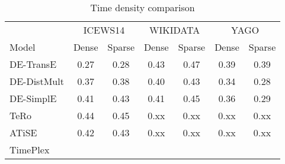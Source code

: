 \begin{table*}[htb]
\centering
\begin{minipage}{0.95\textwidth}
\centering
\caption{Time density comparison}
\vspace{-3mm}

\begin{tabular}{l|cc|cc|cc}\hline
            & \multicolumn{2}{c|}{ICEWS14} & \multicolumn{2}{c|}{WIKIDATA}& \multicolumn{2}{c}{YAGO} \\
Model       & \multicolumn{1}{c|}{Dense} & Sparse & \multicolumn{1}{c|}{Dense} & Sparse & \multicolumn{1}{c|}{Dense} & Sparse \\ \hline
DE-TransE   & 
0.27    & 0.28   &
0.43    & 0.47   &
0.39    & 0.39   \\
DE-DistMult &
0.37    & 0.38   &
0.40    & 0.43   &
0.34    & 0.28   \\
DE-SimplE   &
0.41    & 0.43   &
0.41    & 0.45   &
0.36    & 0.29   \\
TeRo        & 
0.44    & 0.45   &
0.xx    & 0.xx   &
0.xx    & 0.xx   \\
ATiSE       & 
0.42    & 0.43   &
0.xx    & 0.xx   &
0.xx    & 0.xx   \\
TimePlex    &
        &        &
        &        &
        &        \\ \hline
\end{tabular}

\label{fig:time_density_comparison}
\end{minipage}
\end{table*}

